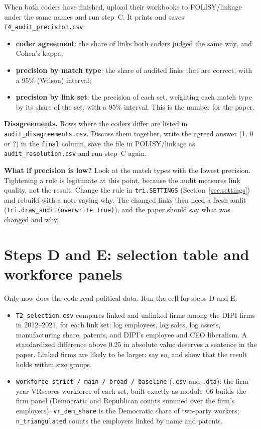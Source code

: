 \documentclass[11pt,a4paper]{article}
\newcommand{\file}[1]{\texttt{#1}}
\begin{document}
When both coders have finished, upload their workbooks to POLISY/linkage under the same names and run step~C. It prints and saves \file{T4\_audit\_precision.csv}:
\begin{itemize}\setlength{\itemsep}{2pt}
\item \textbf{coder agreement}: the share of links both coders judged the same way, and Cohen's kappa;
\item \textbf{precision by match type}: the share of audited links that are correct, with a 95\% (Wilson) interval;
\item \textbf{precision by link set}: the precision of each set, weighting each match type by its share of the set, with a 95\% interval. This is the number for the paper.
\end{itemize}

\textbf{Disagreements.} Rows where the coders differ are listed in \file{audit\_disagreements.csv}. Discuss them together, write the agreed answer (1, 0 or ?) in the \texttt{final} column, save the file in POLISY/linkage as \file{audit\_resolution.csv} and run step~C again.

\textbf{What if precision is low?} Look at the match types with the lowest precision. Tightening a rule is legitimate at this point, because the audit measures link quality, not the result. Change the rule in \texttt{tri.SETTINGS} (Section~\ref{sec:settings}) and rebuild with a note saying why. The changed links then need a fresh audit (\texttt{tri.draw\_audit(overwrite=True)}), and the paper should say what was changed and why.

\section{Steps D and E: selection table and workforce panels}\label{sec:after}

Only now does the code read political data. Run the cell for steps D and E:
\begin{itemize}\setlength{\itemsep}{2pt}
\item \file{T2\_selection.csv} compares linked and unlinked firms among the DIPI firms in 2012--2021, for each link set: log employees, log sales, log assets, manufacturing share, patents, and DIPI's employee and CEO liberalism. A standardized difference above 0.25 in absolute value deserves a sentence in the paper. Linked firms are likely to be larger: say so, and show that the result holds within size groups.
\item \file{workforce\_strict / main / broad / baseline} (\file{.csv} and \file{.dta}): the firm-year VRscores workforce of each set, built exactly as module~06 builds the firm panel (Democratic and Republican counts summed over the firm's employers). \texttt{vr\_dem\_share} is the Democratic share of two-party workers; \texttt{n\_triangulated} counts the employers linked by name and patents.
\end{itemize}
\end{document}

